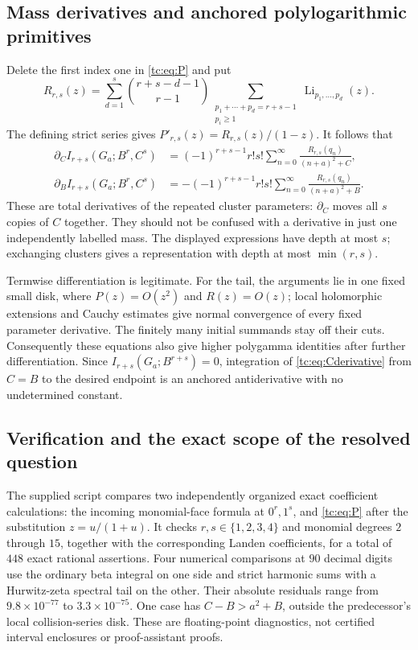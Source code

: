 \subsection{Mass derivatives and anchored polylogarithmic primitives}

Delete the first index one in \eqref{tc:eq:P} and put
\begin{equation}\label{tc:eq:Rpolylog}
 R_{r,s}(z)=\sum_{d=1}^{s}\binom{r+s-d-1}{r-1}
   \sum_{\substack{p_1+\cdots+p_d=r+s-1\\p_i\ge1}}
                       \operatorname{Li}_{p_1,\ldots,p_d}(z).
\end{equation}
The defining strict series gives
$P'_{r,s}(z)=R_{r,s}(z)/(1-z)$.  It follows that
\begin{align}
 \partial_C I_{r+s}(G_a;B^r,C^s)
   &=(-1)^{r+s-1}r!s!
       \sum_{n=0}^{\infty}
           \frac{R_{r,s}(q_n)}{(n+a)^2+C},\label{tc:eq:Cderivative}\\
 \partial_B I_{r+s}(G_a;B^r,C^s)
   &=-(-1)^{r+s-1}r!s!
       \sum_{n=0}^{\infty}
           \frac{R_{r,s}(q_n)}{(n+a)^2+B}.
                                                     \label{tc:eq:Bderivative}
\end{align}
These are total derivatives of the repeated cluster parameters:
$\partial_C$ moves all $s$ copies of $C$ together.  They should not
be confused with a derivative in just one independently labelled mass.
The displayed expressions have depth at most $s$; exchanging clusters
gives a representation with depth at most $\min(r,s)$.

Termwise differentiation is legitimate.  For the tail, the arguments
lie in one fixed small disk, where $P(z)=O(z^2)$ and $R(z)=O(z)$;
local holomorphic extensions and Cauchy estimates give normal
convergence of every fixed parameter derivative.  The finitely many
initial summands stay off their cuts.  Consequently these equations
also give higher polygamma identities after further differentiation.
Since $I_{r+s}(G_a;B^{r+s})=0$, integration of
\eqref{tc:eq:Cderivative} from $C=B$ to the desired endpoint is an
anchored antiderivative with no undetermined constant.

\subsection{Verification and the exact scope of the resolved question}

The supplied script compares two independently organized exact
coefficient calculations: the incoming monomial-face formula at
$0^r,1^s$, and \eqref{tc:eq:P} after the substitution
$z=u/(1+u)$.  It checks $r,s\in\{1,2,3,4\}$ and monomial degrees
$2$ through $15$, together with the corresponding Landen
coefficients, for a total of $448$ exact rational assertions.
Four numerical comparisons at $90$ decimal digits use the ordinary
beta integral on one side and strict harmonic sums with a
Hurwitz-zeta spectral tail on the other.  Their absolute residuals
range from $9.8\times10^{-77}$ to $3.3\times10^{-75}$.
One case has $C-B>a^2+B$, outside the predecessor's local
collision-series disk.  These are floating-point diagnostics,
not certified interval enclosures or proof-assistant proofs.

